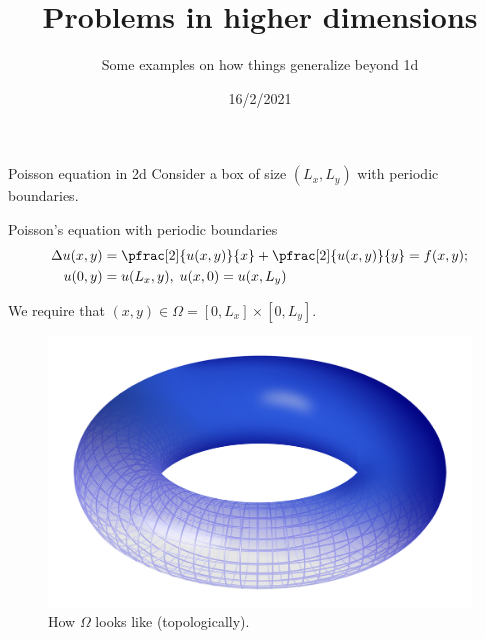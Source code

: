 

\title{Problems in higher dimensions}
\subtitle{Some examples on how things generalize beyond 1d}
\date{16/2/2021}
\date{}


	
	\maketitle
	

\begin{frame}{Poisson equation in 2d}
	Consider a box of size $(L_x,L_y)$ with periodic boundaries.
	\begin{block}{\centering Poisson's equation with periodic boundaries}
		\begin{align*}
			\Delta u(x,y) &= \pfrac[2]{u(x,y)}{x} + \pfrac[2]{u(x,y)}{y} = f(x,y); \\
			u(0,y) &= u(L_x,y), \; u(x,0)=u(x,L_y) 
		\end{align*}
	\end{block}
	We require that $(x,y) \in \Omega = [0,L_x]\times [0,L_y]. $
\end{frame}


\begin{frame}
	\begin{figure}
		\includegraphics[width=0.9\linewidth]{torus.png}
		\caption{How $ \Omega $ looks like (topologically).}
	\end{figure}
\end{frame}

